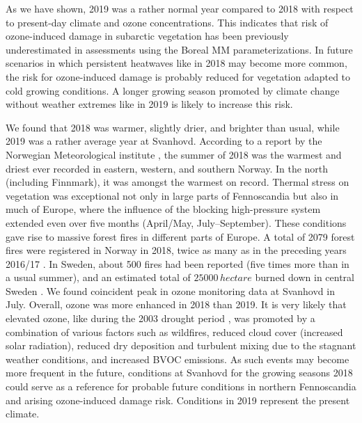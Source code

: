 \documentclass[bg, manuscript]{copernicus}
\begin{document}
As we have shown, 2019 was a rather normal year compared to 2018 with respect to present-day climate and ozone concentrations. This indicates that risk of ozone-induced damage in subarctic vegetation has been previously underestimated in assessments using the Boreal MM parameterizations. In future scenarios in which persistent heatwaves like in 2018 may become more common, the risk for ozone-induced damage is probably reduced for vegetation adapted to cold growing conditions. A longer growing season promoted by climate change without weather extremes like in 2019 is likely to increase this risk.

\label{sec:conc}

We found that 2018 was warmer, slightly drier, and brighter than usual, while 2019 was a rather average year at Svanhovd. According to a report by the Norwegian Meteorological institute \citep{MetNOR2019}, the summer of 2018 was the warmest and driest ever recorded in eastern, western, and southern Norway. In the north (including Finnmark), it was amongst the warmest on record. Thermal stress on vegetation was exceptional not only in large parts of Fennoscandia but also in much of Europe, where the influence of the blocking high-pressure system extended even over five months (April/May, July--September). These conditions gave rise to massive forest fires in different parts of Europe. A total of 2079 forest fires were registered in Norway in 2018, twice as many as in the preceding years 2016/17 \citep[last accessed April 2020]{DSB2019}. In Sweden, about 500 fires had been reported (five times more than in a usual summer), and an estimated total of $25000\,\unit{hectare}$ burned down in central Sweden \citep{SOU2019}. We found coincident peak  in ozone monitoring data at Svanhovd in July. Overall, ozone was more enhanced in 2018 than 2019. It is very likely that elevated ozone, like during the 2003 drought period \citep{JGR:Solberg2018}, was promoted by a combination of various factors such as wildfires, reduced cloud cover (increased solar radiation), reduced dry deposition and turbulent mixing due to the stagnant weather conditions, and increased BVOC emissions. As such events may become more frequent in the future, conditions at Svanhovd for the growing seasons 2018 could serve as a reference for probable future conditions in northern Fennoscandia and arising ozone-induced damage risk. Conditions in 2019 represent the present climate.
\end{document}
